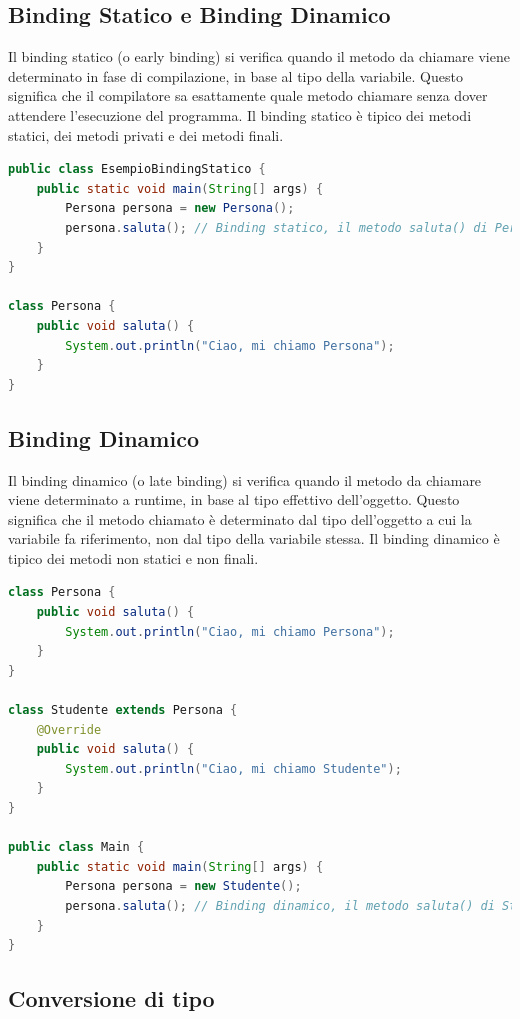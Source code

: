 \documentclass[11pt]{article}
\begin{document}
\subsection{Binding Statico e Binding Dinamico}
Il binding statico (o early binding) si verifica quando il metodo da chiamare viene determinato in fase di compilazione,
in base al tipo della variabile. Questo significa che il compilatore sa esattamente quale metodo chiamare senza dover attendere l'esecuzione del programma.
Il binding statico è tipico dei metodi statici, dei metodi privati e dei metodi finali.
\begin{lstlisting}[language=Java]
public class EsempioBindingStatico {
    public static void main(String[] args) {
        Persona persona = new Persona();
        persona.saluta(); // Binding statico, il metodo saluta() di Persona viene chiamato
    }
}

class Persona {
    public void saluta() {
        System.out.println("Ciao, mi chiamo Persona");
    }
}
\end{lstlisting}
\subsection{Binding Dinamico}
Il binding dinamico (o late binding) si verifica quando il metodo da chiamare viene determinato a runtime,
in base al tipo effettivo dell'oggetto. Questo significa che il metodo chiamato è determinato dal tipo dell'oggetto a cui la variabile fa riferimento,
non dal tipo della variabile stessa. Il binding dinamico è tipico dei metodi non statici e non finali.
\begin{lstlisting}[language=Java]
class Persona {
    public void saluta() {
        System.out.println("Ciao, mi chiamo Persona");
    }
}

class Studente extends Persona {
    @Override
    public void saluta() {
        System.out.println("Ciao, mi chiamo Studente");
    }
}

public class Main {
    public static void main(String[] args) {
        Persona persona = new Studente();
        persona.saluta(); // Binding dinamico, il metodo saluta() di Studente viene chiamato
    }
}
\end{lstlisting}
\subsection{Conversione di tipo}
\end{document}
